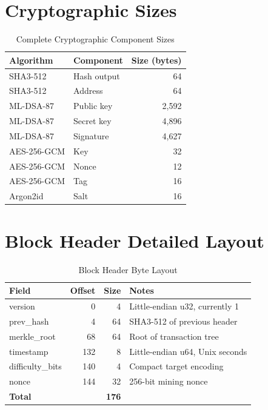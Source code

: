 \documentclass[11pt,a4paper]{article}
\begin{document}
\section{Cryptographic Sizes}

\begin{table}[h]
\centering
\caption{Complete Cryptographic Component Sizes}
\label{tab:keysizes}
\begin{tabular}{@{}llr@{}}
\toprule
Algorithm & Component & Size (bytes) \\
\midrule
SHA3-512 & Hash output & 64 \\
SHA3-512 & Address & 64 \\
ML-DSA-87 & Public key & 2,592 \\
ML-DSA-87 & Secret key & 4,896 \\
ML-DSA-87 & Signature & 4,627 \\
AES-256-GCM & Key & 32 \\
AES-256-GCM & Nonce & 12 \\
AES-256-GCM & Tag & 16 \\
Argon2id & Salt & 16 \\
\bottomrule
\end{tabular}
\end{table}

\section{Block Header Detailed Layout}

\begin{table}[h]
\centering
\caption{Block Header Byte Layout}
\begin{tabular}{@{}lrrp{5cm}@{}}
\toprule
Field & Offset & Size & Notes \\
\midrule
version & 0 & 4 & Little-endian u32, currently 1 \\
prev\_hash & 4 & 64 & SHA3-512 of previous header \\
merkle\_root & 68 & 64 & Root of transaction tree \\
timestamp & 132 & 8 & Little-endian u64, Unix seconds \\
difficulty\_bits & 140 & 4 & Compact target encoding \\
nonce & 144 & 32 & 256-bit mining nonce \\
\midrule
\textbf{Total} & & \textbf{176} & \\
\bottomrule
\end{tabular}
\end{table}
\end{document}
